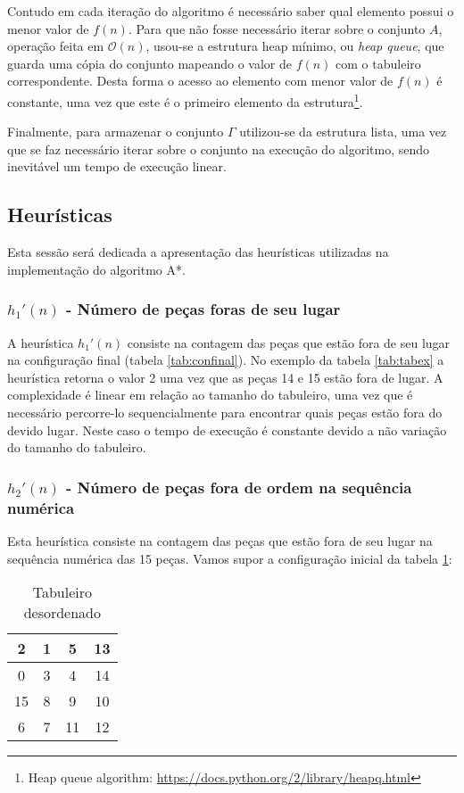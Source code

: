 \documentclass[12pt]{article}
\begin{document}
Contudo em cada iteração do algoritmo é necessário saber qual elemento possui o menor valor de $f(n)$. Para que não fosse necessário iterar sobre o conjunto $A$, operação feita em $\mathcal{O}(n)$,  usou-se a estrutura heap mínimo, ou \textit{heap queue}, que guarda uma cópia do conjunto mapeando o valor de $f(n)$ com o tabuleiro correspondente. Desta forma o acesso ao elemento com menor valor de $f(n)$ é constante, uma vez que este é o primeiro elemento da estrutura\footnote{Heap queue algorithm: \url{https://docs.python.org/2/library/heapq.html}}.

Finalmente, para armazenar o conjunto $\Gamma$ utilizou-se da estrutura lista, uma vez que se faz necessário iterar sobre o conjunto na execução do algoritmo, sendo inevitável um tempo de execução linear.

\subsection{Heurísticas}

Esta sessão será dedicada a apresentação das heurísticas utilizadas na implementação do algoritmo A*.

\subsubsection{$h_{1}'(n)$ - \textbf{Número de peças foras de seu lugar}}

A heurística $h_{1}'(n)$ consiste na contagem das peças que estão fora de seu lugar na configuração final (tabela \ref{tab:confinal}). No exemplo da tabela \ref{tab:tabex} a heurística retorna o valor 2 uma vez que as peças 14 e 15 estão fora de lugar. A complexidade é linear em relação ao tamanho do tabuleiro, uma vez que é necessário percorre-lo sequencialmente para encontrar quais peças estão fora do devido lugar. Neste caso o tempo de execução é constante devido a não variação do tamanho do tabuleiro.

\subsubsection{$h_{2}'(n)$ - \textbf{Número de peças fora de ordem na sequência numérica}}

Esta heurística consiste na contagem das peças que estão fora de seu lugar na sequência numérica das 15 peças. Vamos supor a configuração inicial da tabela \ref{tab:tab3}:

\begin{table}[H]
    \centering
    \begin{tabular}{|c|c|c|c|}
        \hline
        2 & 1 & 5 & 13 \\ \hline
        0 & 3 & 4 & 14 \\ \hline
        15 & 8 & 9 & 10 \\ \hline
        6 & 7 & 11 & 12 \\ \hline
    \end{tabular}
    \caption{Tabuleiro desordenado}
    \label{tab:tab3}
\end{table}
\end{document}

